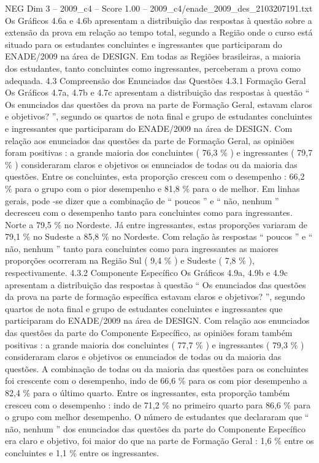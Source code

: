 \begin{textsample}{NEG Dim 3 – 2009\_c4 – Score 1.00 – 2009\_c4/enade\_2009\_des\_2103207191.txt}
Os Gráficos 4.6a e 4.6b apresentam a distribuição das respostas à questão sobre a extensão da prova em relação ao tempo total, segundo a Região onde o curso está situado para os estudantes concluintes e ingressantes que participaram do ENADE/2009 na área de DESIGN.
Em todas as Regiões brasileiras, a maioria dos estudantes, tanto concluintes como ingressantes, perceberam a prova como adequada. 4.3 Compreensão dos Enunciados das Questões 4.3.1 Formação Geral Os Gráficos 4.7a, 4.7b e 4.7c apresentam a distribuição das respostas à questão “ Os enunciados das questões da prova na parte de Formação Geral, estavam claros e objetivos? ”, segundo os quartos de nota final e grupo de estudantes concluintes e ingressantes que participaram do ENADE/2009 na área de DESIGN.
Com relação aos enunciados das questões da parte de Formação Geral, as opiniões foram positivas : a grande maioria dos concluintes ( 76,3 \% ) e ingressantes ( 79,7 \% ) consideraram claros e objetivos os enunciados de todas ou da maioria das questões.
Entre os concluintes, esta proporção cresceu com o desempenho : 66,2 \% para o grupo com o pior desempenho e 81,8 \% para o de melhor.
Em linhas gerais, pode -se dizer que a combinação de “ poucos ” e “ não, nenhum ” decresceu com o desempenho tanto para concluintes como para ingressantes.
Norte a 79,5 \% no Nordeste.
Já entre ingressantes, estas proporções variaram de 79,1 \% no Sudeste a 85,8 \% no Nordeste.
Com relação às respostas “ poucos ” e “ não, nenhum ” tanto para concluintes como para ingressantes as maiores proporções ocorreram na Região Sul ( 9,4 \% ) e Sudeste ( 7,8 \% ), respectivamente. 4.3.2 Componente Específico Os Gráficos 4.9a, 4.9b e 4.9c apresentam a distribuição das respostas à questão “ Os enunciados das questões da prova na parte de formação específica estavam claros e objetivos? ”, segundo quartos de nota final e grupo de estudantes concluintes e ingressantes que participaram do ENADE/2009 na área de DESIGN.
Com relação aos enunciados das questões da parte do Componente Específico, as opiniões foram também positivas : a grande maioria dos concluintes ( 77,7 \% ) e ingressantes ( 79,3 \% ) consideraram claros e objetivos os enunciados de todas ou da maioria das questões.
A combinação de todas ou da maioria das questões para os concluintes foi crescente com o desempenho, indo de 66,6 \% para os com pior desempenho a 82,4 \% para o último quarto.
Entre os ingressantes, esta proporção também cresceu com o desempenho : indo de 71,2 \% no primeiro quarto para 86,6 \% para o grupo com melhor desempenho.
O número de estudantes que declararam que “ não, nenhum ” dos enunciados das questões da parte do Componente Específico era claro e objetivo, foi maior do que na parte de Formação Geral : 1,6 \% entre os concluintes e 1,1 \% entre os ingressantes.

\end{textsample}
